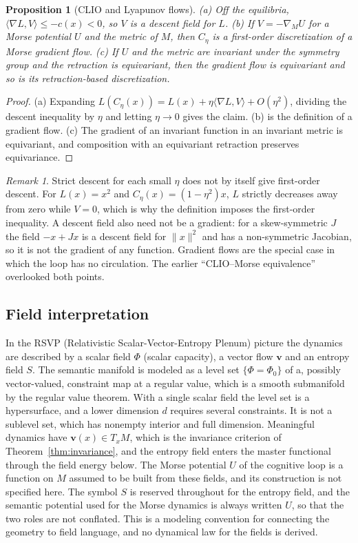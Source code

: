 \documentclass[11pt,a4paper]{article}
\newtheorem{proposition}[theorem]{Proposition}
\theoremstyle{definition}
\theoremstyle{remark}
\newtheorem{remark}[theorem]{Remark}
\begin{document}
\begin{proposition}[CLIO and Lyapunov flows]\label{prop:clio}
(a) Off the equilibria, $\langle\nabla L,V\rangle\le-c(x)<0$, so $V$ is a descent
field for $L$. (b) If $V=-\nabla_MU$ for a Morse potential $U$ and the metric of
$M$, then $C_\eta$ is a first-order discretization of a Morse gradient flow.
(c) If $U$ and the metric are invariant under the symmetry group and the
retraction is equivariant, then the gradient flow is equivariant and so is its
retraction-based discretization.
\end{proposition}

\begin{proof}
(a) Expanding $L(C_\eta(x))=L(x)+\eta\langle\nabla L,V\rangle+O(\eta^2)$,
dividing the descent inequality by $\eta$ and letting $\eta\to0$ gives the
claim. (b) is the definition of a gradient flow. (c) The gradient of an
invariant function in an invariant metric is equivariant, and composition with
an equivariant retraction preserves equivariance.
\end{proof}

\begin{remark}
Strict descent for each small $\eta$ does not by itself give first-order
descent. For $L(x)=x^2$ and $C_\eta(x)=(1-\eta^2)x$, $L$ strictly decreases
away from zero while $V=0$, which is why the definition imposes the
first-order inequality. A descent field also need not be a gradient: for a
skew-symmetric $J$ the field $-x+Jx$ is a descent field for $\|x\|^2$ and has
a non-symmetric Jacobian, so it is not the gradient of any function. Gradient
flows are the special case in which the loop has no circulation. The earlier
``CLIO--Morse equivalence'' overlooked both points.
\end{remark}

\subsection{Field interpretation}

In the RSVP (Relativistic Scalar-Vector-Entropy Plenum) picture the dynamics
are described by a scalar field $\Phi$ (scalar capacity), a vector flow
$\mathbf{v}$ and an entropy field $S$. The semantic manifold is modeled as a
level set $\{\Phi=\Phi_0\}$ of a, possibly vector-valued, constraint map at a
regular value, which is a smooth submanifold by the regular value theorem. With
a single scalar field the level set is a hypersurface, and a lower dimension $d$
requires several constraints. It is not a sublevel set, which has nonempty
interior and full dimension. Meaningful dynamics have $\mathbf{v}(x)\in T_xM$,
which is the invariance criterion of Theorem~\ref{thm:invariance}, and the
entropy field enters the master functional through the field energy below. The
Morse potential $U$ of the cognitive loop is a function on $M$ assumed to be
built from these fields, and its construction is not specified here. The symbol
$S$ is reserved throughout for the entropy field, and the semantic potential
used for the Morse dynamics is always written $U$, so that the two roles are
not conflated. This is a
modeling convention for connecting the geometry to field language, and no
dynamical law for the fields is derived.
\end{document}
